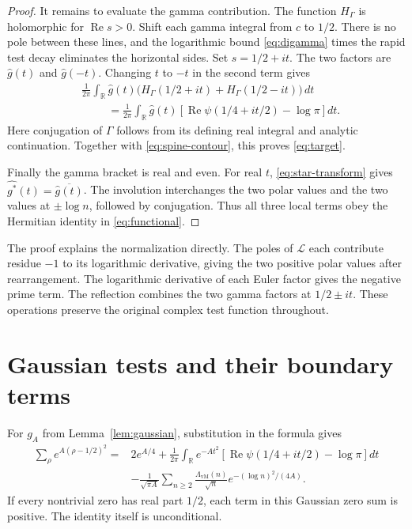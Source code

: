 \documentclass[11pt]{article}
\theoremstyle{definition}
\theoremstyle{remark}
\numberwithin{equation}{section}
\newcommand{\R}{\mathbb R}
\begin{document}
\begin{proof}
It remains to evaluate the gamma contribution.
The function $H_\Gamma$ is holomorphic for $\operatorname{Re}s>0$.
Shift each gamma integral from $c$ to $1/2$.
There is no pole between these lines, and the logarithmic bound
\eqref{eq:digamma} times the rapid test decay eliminates the horizontal sides.
Set $s=1/2+it$.  The two factors are $\widehat g(t)$ and $\widehat g(-t)$.
Changing $t$ to $-t$ in the second term gives
\begin{align*}
 &\frac1{2\pi}\int_{\R}\widehat g(t)
         \bigl(H_\Gamma(1/2+it)+H_\Gamma(1/2-it)\bigr)\,dt\\
 &\hspace{1cm}=\frac1{2\pi}\int_{\R}\widehat g(t)
     \left[\operatorname{Re}\psi(1/4+it/2)-\log\pi\right]dt.
\end{align*}
Here conjugation of $\Gamma$ follows from its defining real integral and
analytic continuation.  Together with \eqref{eq:spine-contour}, this proves
\eqref{eq:target}.

Finally the gamma bracket is real and even.
For real $t$, \eqref{eq:star-transform} gives
$\widehat{g^*}(t)=\overline{\widehat g(t)}$.
The involution interchanges the two polar values and the two values at
$\pm\log n$, followed by conjugation.
Thus all three local terms obey the Hermitian identity in
\eqref{eq:functional}.
\end{proof}

The proof explains the normalization directly.
The poles of $\mathcal L$ each contribute residue $-1$ to its logarithmic
derivative, giving the two positive polar values after rearrangement.
The logarithmic derivative of each Euler factor gives the negative prime
term.  The reflection combines the two gamma factors at $1/2\pm it$.
These operations preserve the original complex test function throughout.

\section{Gaussian tests and their boundary terms}
\label{sec:polynomial-gaussians}

For $g_A$ from Lemma~\ref{lem:gaussian}, substitution in the formula gives
\begin{equation}
\begin{split}
 \sum_\rho e^{A(\rho-1/2)^2}
 ={}&2e^{A/4}
   +\frac1{2\pi}\int_{\R}e^{-At^2}
      \left[\operatorname{Re}\psi(1/4+it/2)-\log\pi\right]dt\\
 &-\frac1{\sqrt{\pi A}}\sum_{n\geq2}
       \frac{\Lambda_{\mathrm{vM}}(n)}{\sqrt n}
                       e^{-(\log n)^2/(4A)}.
\end{split}
\label{eq:gaussian-explicit}
\end{equation}
If every nontrivial zero has real part $1/2$, each term in this Gaussian
zero sum is positive.  The identity itself is unconditional.
\end{document}
